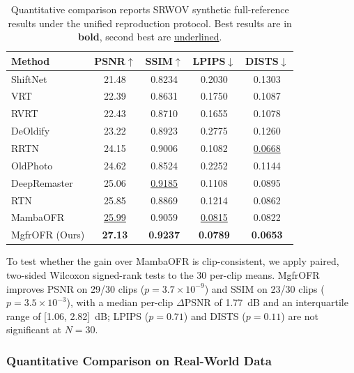 \begin{table}[htbp]
\caption{Quantitative comparison reports SRWOV synthetic full-reference results under the unified reproduction protocol. Best results are in \textbf{bold}, second best are \underline{underlined}.\label{tab:sota}}
\begin{tabularx}{\textwidth}{lCCCC}
\toprule
\textbf{Method} & \textbf{PSNR$\uparrow$} & \textbf{SSIM$\uparrow$} & \textbf{LPIPS$\downarrow$} & \textbf{DISTS$\downarrow$} \\
\midrule
ShiftNet~\cite{li2023shiftnet}          & 21.48 & 0.8234 & 0.2030 & 0.1303 \\
VRT~\cite{liang2024vrt}                 & 22.39 & 0.8631 & 0.1750 & 0.1087 \\
RVRT~\cite{liang2022rvrt}              & 22.43 & 0.8710 & 0.1655 & 0.1078 \\
DeOldify~\cite{jantic2019deoldify}      & 23.22 & 0.8923 & 0.2775 & 0.1260 \\
RRTN~\cite{lin2024rrtn}                & 24.15 & 0.9006 & 0.1082 & \underline{0.0668} \\
OldPhoto~\cite{wan2023oldphotopami}     & 24.62 & 0.8524 & 0.2252 & 0.1144 \\
DeepRemaster~\cite{iizuka2019deepremaster} & 25.06 & \underline{0.9185} & 0.1108 & 0.0895 \\
RTN~\cite{wan2022rtn}                   & 25.85 & 0.8869 & 0.1214 & 0.0862 \\
MambaOFR~\cite{mao2025mambaofr}        & \underline{25.99} & 0.9059 & \underline{0.0815} & 0.0822 \\
\midrule
MgfrOFR (Ours)                          & \textbf{27.13} & \textbf{0.9237} & \textbf{0.0789} & \textbf{0.0653} \\
\bottomrule
\end{tabularx}
\end{table}

To test whether the gain over MambaOFR is clip-consistent, we apply paired, two-sided Wilcoxon signed-rank tests to the 30 per-clip means. MgfrOFR improves PSNR on 29/30 clips ($p=3.7\times10^{-9}$) and SSIM on 23/30 clips ($p=3.5\times10^{-3}$), with a median per-clip $\Delta$PSNR of 1.77~dB and an interquartile range of [1.06, 2.82]~dB; LPIPS ($p=0.71$) and DISTS ($p=0.11$) are not significant at $N{=}30$.

\subsubsection{Quantitative Comparison on Real-World Data}

